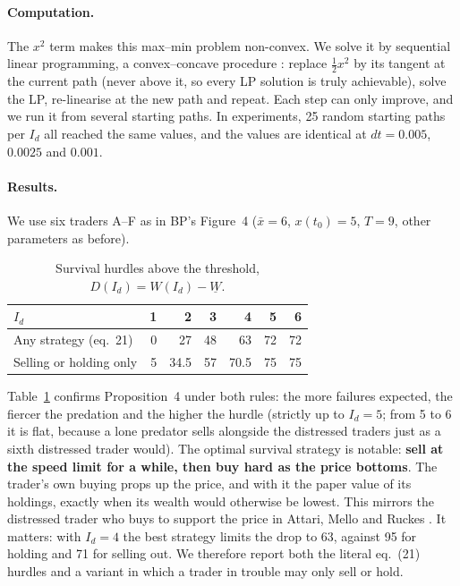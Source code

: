 \documentclass[11pt,a4paper]{article}
\newcommand{\xbar}{\bar x}
\begin{document}
\paragraph{Computation.} The $x^2$ term makes this max--min problem non-convex. We solve it by
sequential linear programming, a convex--concave procedure \cite{lipp2016}: replace
$\tfrac12 x^2$ by its tangent at the current path (never above it, so every LP solution is
truly achievable), solve the LP, re-linearise at the new path and repeat. Each step can only
improve, and we run it from several starting paths. In experiments, 25 random starting paths
per $I_d$ all reached the same values, and the values are identical at $dt = 0.005$,
$0.0025$ and $0.001$.

\paragraph{Results.} We use six traders A--F as in BP's Figure~4 ($\xbar = 6$,
$x(t_0) = 5$, $T = 9$, other parameters as before).

\begin{table}[h]
  \centering\small
  \caption{Survival hurdles above the threshold, $D(I_d) = W(I_d) - \underline W$.}
  \label{tab:hurdles}
  \begin{tabular}{@{}lrrrrrr@{}}
    \toprule
    $I_d$ & 1 & 2 & 3 & 4 & 5 & 6 \\
    \midrule
    Any strategy (eq.~21) & 0 & 27 & 48 & 63 & 72 & 72 \\
    Selling or holding only & 5 & 34.5 & 57 & 70.5 & 75 & 75 \\
    \bottomrule
  \end{tabular}
\end{table}

Table~\ref{tab:hurdles} confirms Proposition~4 under both rules: the more failures expected,
the fiercer the predation and the higher the hurdle (strictly up to $I_d = 5$; from 5 to 6 it
is flat, because a lone predator sells alongside the distressed traders just as a sixth
distressed trader would). The optimal survival strategy is notable: \textbf{sell at the speed
limit for a while, then buy hard as the price bottoms}. The trader's own buying props up the
price, and with it the paper value of its holdings, exactly when its wealth would otherwise
be lowest. This mirrors the distressed trader who buys to support the price in Attari, Mello
and Ruckes \cite{amr2005}. It matters: with $I_d = 4$ the best strategy limits the drop to 63,
against 95 for holding and 71 for selling out. We therefore report both the literal eq.~(21)
hurdles and a variant in which a trader in trouble may only sell or hold.
\end{document}
